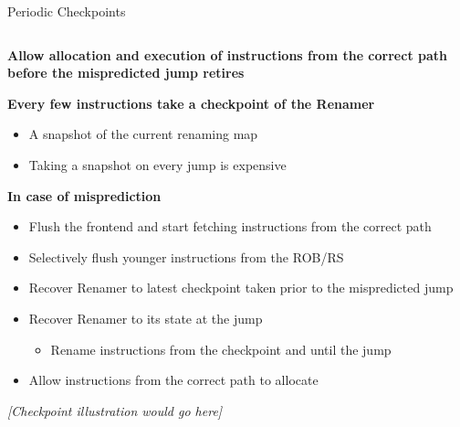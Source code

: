 \documentclass[aspectratio=169,12pt]{beamer}
\begin{document}
\begin{frame}{Periodic Checkpoints}
    \centering
    
    \begin{columns}[T]
        \begin{column}{0.9\textwidth}
            \textbf{Allow allocation and execution of instructions from the correct path before the mispredicted jump retires}
            
            \vspace{0.3cm}
            \textbf{Every few instructions take a checkpoint of the Renamer}
            \begin{itemize}
                \item A snapshot of the current renaming map
                \item Taking a snapshot on every jump is expensive
            \end{itemize}
            
            \textbf{In case of misprediction}
            \begin{itemize}
                \item Flush the frontend and start fetching instructions from the correct path
                \item Selectively flush younger instructions from the ROB/RS
                \item Recover Renamer to latest checkpoint taken prior to the mispredicted jump
                \item Recover Renamer to its state at the jump
                \begin{itemize}
                    \item Rename instructions from the checkpoint and until the jump
                \end{itemize}
                \item Allow instructions from the correct path to allocate
            \end{itemize}
            
            \vspace{0.3cm}
            \textit{[Checkpoint illustration would go here]}
        \end{column}
    \end{columns}
\end{frame}
\end{document}
